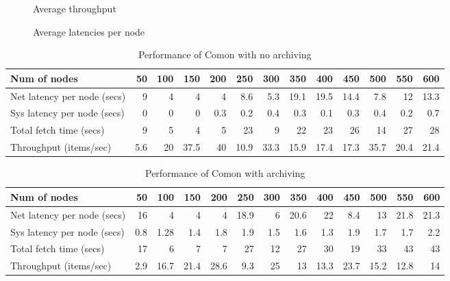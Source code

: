 \begin{figure}
\begin{center}
\caption{Average throughput}
\end{center}
\end{figure}

\begin{figure}
\begin{center}
\caption{Average latencies per node}
\end{center}
\end{figure}


\begin{table*}
\begin{center}
\begin{tabular}{|l|r|r|r|r|r|r|r|r|r|r|r|r|}\hline
Num of nodes&	50&	100&	150&	200&	250&	300&	350&	400&	450&	500&	550&	600 \\ \hline\hline
Net latency per node (secs)&	9&	4&	4&	4&	8.6&	5.3&	19.1&	19.5&	14.4&	7.8&	12&	13.3 \\ \hline
Sys latency per node (secs)&	0&	0&	0&	0.3&	0.2&	0.4&	0.3&	0.1&	0.3&	0.4&	0.2&	0.7 \\ \hline
Total fetch time (secs)&	9&	5&	4&	5&	23&	9&	22&	23&	26&	14&	27&	28 \\ \hline	
Throughput (items/sec)&	5.6&	20&	37.5&	40&	10.9&	33.3&	15.9&	17.4&	17.3&	35.7&	20.4&	21.4 \\ \hline
\end{tabular}
\end{center}
\caption{Performance of Comon with no archiving}
\end{table*}


\begin{table*}
\begin{center}
\begin{tabular}{|l|r|r|r|r|r|r|r|r|r|r|r|r|}\hline
Num of nodes&	50&	100&	150&	200&	250&	300&	350&	400&	450&	500&	550&	600 \\ \hline\hline
Net latency per node (secs)&	16&	4&	4&	4&	18.9&	6&	20.6&	22&	8.4&	13&	21.8&	21.3 \\ \hline
Sys latency per node (secs)&	0.8&	1.28&	1.4&	1.8&	1.9&	1.5&	1.6&	1.3&	1.9&	1.7&	1.7&	2.2 \\ \hline
Total fetch time (secs)&	17&	6&	7&	7&	27&	12&	27&	30&	19&	33&	43&	43 \\ \hline
Throughput (items/sec)&	2.9&	16.7&	21.4&	28.6&	9.3&	25&	13&	13.3&	23.7&	15.2&	12.8&	14 \\ \hline
\end{tabular}
\end{center}
\caption{Performance of Comon with archiving}
\end{table*}

